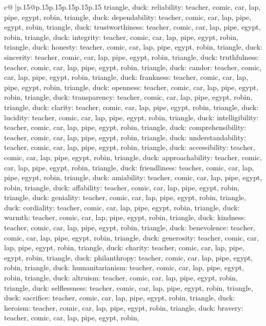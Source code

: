 \documentclass{article}
\begin{document}
{\begin{supertabular}{c@{$\;$}|p{.15\linewidth}@{}p{.15\linewidth}p{.15\linewidth}p{.15\linewidth}p{.15\linewidth}p{.15\linewidth}}
{{{triangle, duck\n\nCLUE: reliability\nTARGETS: teacher, comic, car, lap, pipe, egypt, robin, triangle, duck\n\nCLUE: dependability\nTARGETS: teacher, comic, car, lap, pipe, egypt, robin, triangle, duck\n\nCLUE: trustworthiness\nTARGETS: teacher, comic, car, lap, pipe, egypt, robin, triangle, duck\n\nCLUE: integrity\nTARGETS: teacher, comic, car, lap, pipe, egypt, robin, triangle, duck\n\nCLUE: honesty\nTARGETS: teacher, comic, car, lap, pipe, egypt, robin, triangle, duck\n\nCLUE: sincerity\nTARGETS: teacher, comic, car, lap, pipe, egypt, robin, triangle, duck\n\nCLUE: truthfulness\nTARGETS: teacher, comic, car, lap, pipe, egypt, robin, triangle, duck\n\nCLUE: candor\nTARGETS: teacher, comic, car, lap, pipe, egypt, robin, triangle, duck\n\nCLUE: frankness\nTARGETS: teacher, comic, car, lap, pipe, egypt, robin, triangle, duck\n\nCLUE: openness\nTARGETS: teacher, comic, car, lap, pipe, egypt, robin, triangle, duck\n\nCLUE: transparency\nTARGETS: teacher, comic, car, lap, pipe, egypt, robin, triangle, duck\n\nCLUE: clarity\nTARGETS: teacher, comic, car, lap, pipe, egypt, robin, triangle, duck\n\nCLUE: lucidity\nTARGETS: teacher, comic, car, lap, pipe, egypt, robin, triangle, duck\n\nCLUE: intelligibility\nTARGETS: teacher, comic, car, lap, pipe, egypt, robin, triangle, duck\n\nCLUE: comprehensibility\nTARGETS: teacher, comic, car, lap, pipe, egypt, robin, triangle, duck\n\nCLUE: understandability\nTARGETS: teacher, comic, car, lap, pipe, egypt, robin, triangle, duck\n\nCLUE: accessibility\nTARGETS: teacher, comic, car, lap, pipe, egypt, robin, triangle, duck\n\nCLUE: approachability\nTARGETS: teacher, comic, car, lap, pipe, egypt, robin, triangle, duck\n\nCLUE: friendliness\nTARGETS: teacher, comic, car, lap, pipe, egypt, robin, triangle, duck\n\nCLUE: amiability\nTARGETS: teacher, comic, car, lap, pipe, egypt, robin, triangle, duck\n\nCLUE: affability\nTARGETS: teacher, comic, car, lap, pipe, egypt, robin, triangle, duck\n\nCLUE: geniality\nTARGETS: teacher, comic, car, lap, pipe, egypt, robin, triangle, duck\n\nCLUE: cordiality\nTARGETS: teacher, comic, car, lap, pipe, egypt, robin, triangle, duck\n\nCLUE: warmth\nTARGETS: teacher, comic, car, lap, pipe, egypt, robin, triangle, duck\n\nCLUE: kindness\nTARGETS: teacher, comic, car, lap, pipe, egypt, robin, triangle, duck\n\nCLUE: benevolence\nTARGETS: teacher, comic, car, lap, pipe, egypt, robin, triangle, duck\n\nCLUE: generosity\nTARGETS: teacher, comic, car, lap, pipe, egypt, robin, triangle, duck\n\nCLUE: charity\nTARGETS: teacher, comic, car, lap, pipe, egypt, robin, triangle, duck\n\nCLUE: philanthropy\nTARGETS: teacher, comic, car, lap, pipe, egypt, robin, triangle, duck\n\nCLUE: humanitarianism\nTARGETS: teacher, comic, car, lap, pipe, egypt, robin, triangle, duck\n\nCLUE: altruism\nTARGETS: teacher, comic, car, lap, pipe, egypt, robin, triangle, duck\n\nCLUE: selflessness\nTARGETS: teacher, comic, car, lap, pipe, egypt, robin, triangle, duck\n\nCLUE: sacrifice\nTARGETS: teacher, comic, car, lap, pipe, egypt, robin, triangle, duck\n\nCLUE: heroism\nTARGETS: teacher, comic, car, lap, pipe, egypt, robin, triangle, duck\n\nCLUE: bravery\nTARGETS: teacher, comic, car, lap, pipe, egypt, robin, }}}
\end{supertabular}}
\end{document}
